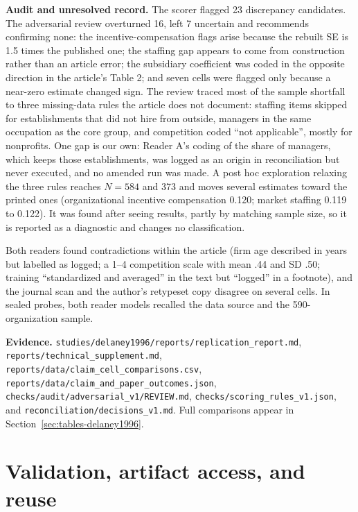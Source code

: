 \documentclass[11pt]{article}
\newcommand{\artifact}[1]{\nolinkurl{#1}}
\begin{document}
\textbf{Audit and unresolved record.} The scorer flagged 23 discrepancy candidates. The adversarial review overturned 16, left 7 uncertain and recommends confirming none: the incentive-compensation flags arise because the rebuilt SE is 1.5 times the published one; the staffing gap appears to come from construction rather than an article error; the subsidiary coefficient was coded in the opposite direction in the article's Table 2; and seven cells were flagged only because a near-zero estimate changed sign. The review traced most of the sample shortfall to three missing-data rules the article does not document: staffing items skipped for establishments that did not hire from outside, managers in the same occupation as the core group, and competition coded ``not applicable'', mostly for nonprofits. One gap is our own: Reader A's coding of the share of managers, which keeps those establishments, was logged as an origin in reconciliation but never executed, and no amended run was made. A post hoc exploration relaxing the three rules reaches $N=584$ and 373 and moves several estimates toward the printed ones (organizational incentive compensation 0.120; market staffing 0.119 to 0.122). It was found after seeing results, partly by matching sample size, so it is reported as a diagnostic and changes no classification.

Both readers found contradictions within the article (firm age described in years but labelled as logged; a 1--4 competition scale with mean .44 and SD .50; training ``standardized and averaged'' in the text but ``logged'' in a footnote), and the journal scan and the author's retypeset copy disagree on several cells. In sealed probes, both reader models recalled the data source and the 590-organization sample.

\textbf{Evidence.} \artifact{studies/delaney1996/reports/replication_report.md}, \artifact{reports/technical_supplement.md}, \artifact{reports/data/claim_cell_comparisons.csv}, \artifact{reports/data/claim_and_paper_outcomes.json}, \artifact{checks/audit/adversarial_v1/REVIEW.md}, \artifact{checks/scoring_rules_v1.json}, and \artifact{reconciliation/decisions_v1.md}. Full comparisons appear in Section~\ref{sec:tables-delaney1996}.

\clearpage
\section{Validation, artifact access, and reuse}\label{sec:reuse}
\end{document}
